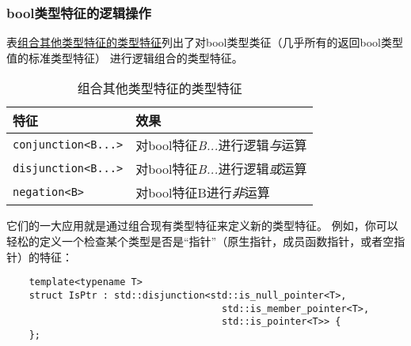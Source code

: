 \subsubsection{bool类型特征的逻辑操作}
表\hyperref[t21.2]{组合其他类型特征的类型特征}列出了对bool类型类征（几乎所有的返回bool类型值的标准类型特征）
进行逻辑组合的类型特征。
\begin{table}[ht]
    \centering
    \begin{tabular}{l|l}
        \hline
        \textbf{特征}                & \textbf{效果}               \\
        \hline
        \texttt{conjunction<B...>} & 对bool特征\emph{B...}进行逻辑\emph{与}运算 \\
        \texttt{disjunction<B...>} & 对bool特征\emph{B...}进行逻辑\emph{或}运算 \\
        \texttt{negation<B>}       & 对bool特征B进行\emph{非}运算             \\
        \hline
    \end{tabular}
    \caption{组合其他类型特征的类型特征}
    \label{t21.2}
\end{table}

它们的一大应用就是通过组合现有类型特征来定义新的类型特征。
例如，你可以轻松的定义一个检查某个类型是否是“指针”（原生指针，成员函数指针，或者空指针）的特征：
\begin{lstlisting}
    template<typename T>
    struct IsPtr : std::disjunction<std::is_null_pointer<T>,
                                      std::is_member_pointer<T>,
                                      std::is_pointer<T>> {
    };
\end{lstlisting}

